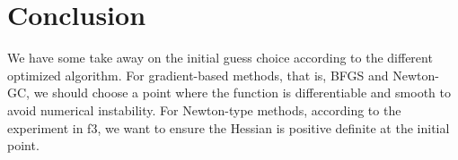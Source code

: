 \documentclass[12pt]{article}
\begin{document}

\section{Conclusion}

We have some take away on the initial guess choice according to the different optimized algorithm. For gradient-based methods, that is, BFGS and Newton-GC, we should choose a point where the function is differentiable and smooth to avoid numerical instability. For Newton-type methods, according to the experiment in f3, we want to ensure the Hessian is positive definite at the initial point. 



\end{document}
